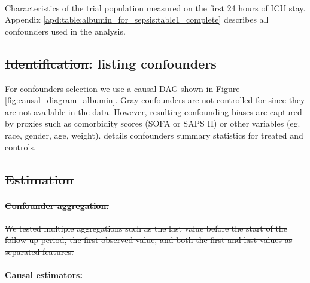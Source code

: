 \documentclass[10pt,letterpaper]{article}
\providecommand{\DIFaddtex}[1]{{\protect\color{blue}\uwave{#1}}} %
\providecommand{\DIFdeltex}[1]{{\protect\color{red}\sout{#1}}}                      %
\providecommand{\DIFaddbegin}{} %
\providecommand{\DIFaddend}{} %
\providecommand{\DIFdelbegin}{} %
\providecommand{\DIFdelend}{} %
\providecommand{\DIFadd}[1]{\texorpdfstring{\DIFaddtex{#1}}{#1}} %
\providecommand{\DIFdel}[1]{\texorpdfstring{\DIFdeltex{#1}}{}} %
\newcommand{\DIFscaledelfig}{0.5}
\newlength{\DIFdelgraphicswidth} %
\newlength{\DIFdelgraphicsheight} %
\newcommand{\DIFaddincludegraphics}[2][]{{\color{blue}\fbox{\DIFOincludegraphics[#1]{#2}}}} %
\newcommand{\DIFdelincludegraphics}[2][]{%
\sbox{\DIFdelgraphicsbox}{\DIFOincludegraphics[#1]{#2}}%
\settoboxwidth{\DIFdelgraphicswidth}{\DIFdelgraphicsbox} %
\settoboxtotalheight{\DIFdelgraphicsheight}{\DIFdelgraphicsbox} %
\scalebox{\DIFscaledelfig}{%
\parbox[b]{\DIFdelgraphicswidth}{\usebox{\DIFdelgraphicsbox}\\[-\baselineskip] \rule{\DIFdelgraphicswidth}{0em}}\llap{\resizebox{\DIFdelgraphicswidth}{\DIFdelgraphicsheight}{%
\setlength{\unitlength}{\DIFdelgraphicswidth}%
\begin{picture}(1,1)%
\thicklines\linethickness{2pt} %
{\color[rgb]{1,0,0}\put(0,0){\framebox(1,1){}}}%
{\color[rgb]{1,0,0}\put(0,0){\line( 1,1){1}}}%
{\color[rgb]{1,0,0}\put(0,1){\line(1,-1){1}}}%
\end{picture}%
}\hspace*{3pt}}} %
} %
\DeclareRobustCommand{\DIFaddbegin}{\DIFOaddbegin \let\includegraphics\DIFaddincludegraphics} %
\DeclareRobustCommand{\DIFaddend}{\DIFOaddend \let\includegraphics\DIFOincludegraphics} %
\DeclareRobustCommand{\DIFdelbegin}{\DIFOdelbegin \let\includegraphics\DIFdelincludegraphics} %
\DeclareRobustCommand{\DIFdelend}{\DIFOaddend \let\includegraphics\DIFOincludegraphics} %
\begin{document}
\begin{table}[h!]
  \centering\small
  \resizebox{\columnwidth}{!}{
  }
  \\[.5ex]

  \caption{Characteristics of the trial population measured on the first 24
    hours of ICU stay. Appendix \ref{apd:table:albumin_for_sepsis:table1_complete}
    describes all confounders used in the analysis.}\label{table:albumin_for_sepsis:table1_simple}
\end{table}


\subsection*{\DIFdelbegin \DIFdel{Identification}\DIFdelend \DIFaddbegin \DIFadd{Step 2}\DIFaddend : \DIFaddbegin \DIFadd{Identification -- }\DIFaddend listing confounders}\label{sec:identification_mimic_iv}

For confounders selection we use a causal DAG shown in Figure
\DIFdelbegin \DIFdel{\ref{fig:causal_diagram_albumin}}\DIFdelend \DIFaddbegin {}\DIFaddend . Gray confounders are not controlled for since
they are not available in the data. However, resulting confounding biases are
captured by proxies such as comorbidity scores (SOFA or SAPS II) or other
variables (eg. race, gender, age, weight).
%
 details confounders
summary statistics for treated and controls.


\DIFdelbegin \subsection*{\DIFdel{Estimation}}%

\paragraph{\DIFdel{Confounder aggregation:}}
\addtocounter{paragraph}{-1}%

\DIFdel{We tested multiple aggregations such as the last value before the start of the
  follow-up period, the first observed value, and both the first and last values as
  separated features.
}%

\DIFdelend \paragraph{Causal estimators:}
\end{document}
